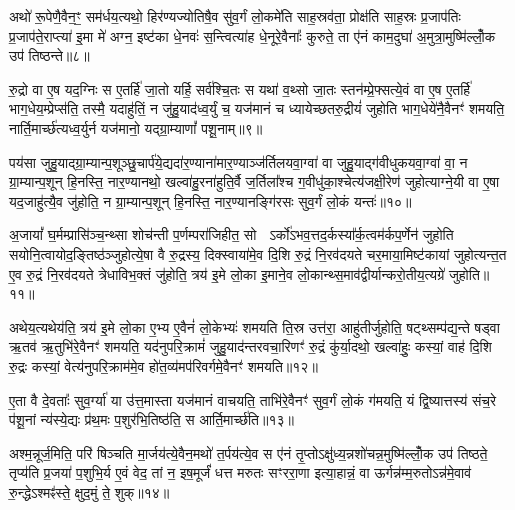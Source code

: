 अथो॑ रू॒पेणै॒वैन॒ꣳ॒ सम॑र्धय॒त्यथो॒ हिर॑ण्यज्योतिषै॒व सु॑व॒र्गं लो॒कमे॑ति साह॒स्रव॑ता॒ प्रोक्ष॑ति साह॒स्रः प्र॒जाप॑तिः प्र॒जाप॑ते॒राप्त्या॑ इ॒मा मे॑ अग्न॒ इष्ट॑का धे॒नवः॑ स॒न्त्वित्या॑ह धे॒नूरे॒वैनाः᳚ कुरुते॒ ता ए॑नं काम॒दुघा॑ अ॒मुत्रा॒मुष्मि॑ल्लोँ॒क उप॑ तिष्ठन्ते॥८॥

{\anuvakamend[{सयो॑निमे॒ता वै क॑रो॒त्येका॒न्नच॑त्वारि॒ꣳ॒शच्च॑॥२॥}]}

रु॒द्रो वा ए॒ष यद॒ग्निः स ए॒तर्\mbox{}हि॑ जा॒तो यर्\mbox{}हि॒ सर्व॑श्चि॒तः स यथा॑ व॒थ्सो जा॒तः स्तन॑म्प्रे॒फ्सत्ये॒वं वा ए॒ष ए॒तर्\mbox{}हि॑ भाग॒धेय॒म्प्रेप्स॑ति॒ तस्मै॒ यदाहु॑तिं॒ न जु॑हु॒याद॑ध्व॒र्युं च॒ यज॑मानं च ध्यायेच्छतरु॒द्रीयं॑ जुहोति भाग॒धेये॑नै॒वैनꣳ॑ शमयति॒ नार्ति॒मार्च्छ॑त्यध्व॒र्युर्न यज॑मानो॒ यद्ग्रा॒म्याणां᳚ पशू॒नाम्॥९॥

पय॑सा जुहु॒याद्ग्रा॒म्यान्प॒शूञ्छु॒चार्प॑ये॒द्यदा॑र॒ण्याना॑मार॒ण्याञ्ज॑र्तिलयवा॒ग्वा॑ वा जुहु॒याद्ग॑वीधुकयवा॒ग्वा॑ वा॒ न ग्रा॒म्यान्प॒शून् हि॒नस्ति॒ नार॒ण्यानथो॒ खल्वा॑हु॒रना॑हुति॒र्वै ज॒र्तिला᳚श्च ग॒वीधु॑का॒श्चेत्य॑जक्षी॒रेण॑ जुहोत्याग्ने॒यी वा ए॒षा यद॒जाहु॑त्यै॒व जु॑होति॒ न ग्रा॒म्यान्प॒शून् हि॒नस्ति॒ नार॒ण्यानङ्गि॑रसः सुव॒र्गं लो॒कं यन्तः॑॥१०॥

अ॒जायां᳚ घ॒र्मम्प्रासि॑ञ्च॒न्थ्सा शोच॑न्ती प॒र्णम्परा॑जिहीत॒ सो  \-ऽर्को॑\-ऽभव॒त्तद॒र्कस्या᳚र्क॒त्वम॑र्कप॒र्णेन॑ जुहोति सयोनि॒त्वायोद॒ङ्तिष्ठ॑ञ्जुहोत्ये॒षा वै रु॒द्रस्य॒ दिक्स्वाया॑मे॒व दि॒शि रु॒द्रं नि॒रव॑दयते चर॒माया॒मिष्ट॑कायां जुहोत्यन्त॒त ए॒व रु॒द्रं नि॒रव॑दयते त्रेधाविभ॒क्तं जु॑होति॒ त्रय॑ इ॒मे लो॒का इ॒माने॒व लो॒कान्थ्स॒माव॑द्वीर्यान्करो॒तीय॒त्यग्रे॑ जुहोति॥११॥

अथेय॒त्यथेय॑ति॒ त्रय॑ इ॒मे लो॒का ए॒भ्य ए॒वैनं॑ लो॒केभ्यः॑ शमयति ति॒स्र उत्त॑रा॒ आहु॑तीर्जुहोति॒ षट्थ्सम्प॑द्य॒न्ते षड्वा ऋ॒तव॑ ऋ॒तुभि॑रे॒वैनꣳ॑ शमयति॒ यद॑नुपरि॒क्रामं॑ जुहु॒याद॑न्तरवचा॒रिणꣳ॑ रु॒द्रं कु॑र्या॒दथो॒ खल्वा॑हुः॒ कस्यां॒ वाह॑ दि॒शि रु॒द्रः कस्यां॒ वेत्य॑नुपरि॒क्राम॑मे॒व हो॑त॒व्य॑मप॑रिवर्गमे॒वैनꣳ॑ शमयति॥१२॥

ए॒ता वै दे॒वताः᳚ सुव॒र्ग्या॑ या उ॑त्त॒मास्ता यज॑मानं वाचयति॒ ताभि॑रे॒वैनꣳ॑ सुव॒र्गं लो॒कं ग॑मयति॒ यं द्वि॒ष्यात्तस्य॑ संच॒रे प॑शू॒नां न्य॑स्ये॒द्यः प्र॑थ॒मः प॒शुर॑भि॒तिष्ठ॑ति॒ स आर्ति॒मार्च्छ॑ति॥१३॥

{\anuvakamend[{प॒शू॒नां यन्तो\-ऽग्रे॑ जुहो॒त्यप॑रिवर्गमे॒वैनꣳ॑ शमयति त्रि॒ꣳ॒शच्च॑॥३॥}]}

अश्म॒न्नूर्ज॒मिति॒ परि॑ षिञ्चति मा॒र्जय॑त्ये॒वैन॒मथो॑ त॒र्पय॑त्ये॒व स ए॑नं तृ॒प्तो\-ऽक्षु॑ध्य॒न्नशो॑चन्न॒मुष्मि॑ल्लोँ॒क उप॑ तिष्ठते॒ तृप्य॑ति प्र॒जया॑ प॒शुभि॒र्य ए॒वं वेद॒ तां न॒ इष॒मूर्जं॑ धत्त मरुतः सꣳररा॒णा इत्या॒हान्नं॒ वा ऊर्गन्न॑म्म॒रुतो\-ऽन्न॑मे॒वाव॑ रु॒न्द्धे\-ऽश्मꣴ॑स्ते॒ क्षुद॒मुं ते॒ शुक्॥१४॥

